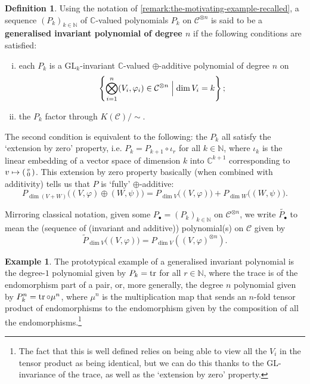 \documentclass[11pt,fleqn]{article}
\theoremstyle{plain}
\theoremstyle{definition}
\newtheorem{definition}[theorem]{Definition}
\newtheorem{example}[theorem]{Example}
\theoremstyle{remark}
\numberwithin{equation}{theorem}
\newcommand{\GL}{\mathrm{GL}}
\newcommand{\define}[1]{\textbf{#1}}
\begin{document}
        \begin{definition}\label{definition:generalised-invariant-polynomial}
            Using the notation of \cref{remark:the-motivating-example-recalled}, a sequence $(P_k)_{k\in\mathbb{N}}$ of $\mathbb{C}$-valued polynomials $P_k$ on $\mathcal{C}^{\otimes n}$ is said to be a \define{generalised invariant polynomial of degree $n$} if the following conditions are satisfied:
            \begin{enumerate}[(i)]
                \item each $P_k$ is a $\GL_k$-invariant $\mathbb{C}$-valued $\oplus$-additive polynomial of degree $n$ on
                \[
                    \left\{\bigotimes_{i=1}^n(V_i,\varphi_i)\in\mathcal{C}^{\otimes n} \Bigm\vert \dim V_i=k\right\};
                \]
                \item the $P_k$ factor through $K(\mathcal{C})/\!\sim$.
            \end{enumerate}
            The second condition is equivalent to the following: the $P_k$ all satisfy the `extension by zero' property, i.e. $P_k=P_{k+1}\circ\iota_r$ for all $k\in\mathbb{N}$, where $\iota_k$ is the linear embedding of a vector space of dimension $k$ into $\mathbb{C}^{k+1}$ corresponding to $v\mapsto\smqty(v\\0)$.
            This extension by zero property basically (when combined with additivity) tells us that $P$ is `fully' $\oplus$-additive:
            \[
                P_{\dim(V+W)}\big((V,\varphi)\oplus(W,\psi)\big) = P_{\dim V}\big((V,\varphi)\big) + P_{\dim W}\big((W,\psi)\big).
            \]

            Mirroring classical notation, given some \mbox{$P_\bullet=(P_k)_{k\in\mathbb{N}}$} on $\mathcal{C}^{\otimes n}$, we write $\widetilde{P_\bullet}$ to mean the (sequence of (invariant and additive)) polynomial(s) on $\mathcal{C}$ given by
            \[
                \widetilde{P}_{\dim V}\big((V,\varphi)\big) = P_{\dim V}\left((V,\varphi)^{\otimes n}\right).
            \]
        \end{definition}

        \begin{example}
            The prototypical example of a generalised invariant polynomial is the degree-$1$ polynomial given by $P_k=\tr$ for all $r\in\mathbb{N}$, where the trace is of the endomorphism part of a pair, or, more generally, the degree $n$ polynomial given by $P_k^n=\tr\circ\mu^n$, where $\mu^n$ is the multiplication map that sends an $n$-fold tensor product of endomorphisms to the endomorphism given by the composition of all the endomorphisms.\footnote{The fact that this is well defined relies on being able to view all the $V_i$ in the tensor product as being identical, but we can do this thanks to the $\GL$-invariance of the trace, as well as the `extension by zero' property.}
        \end{example}
\end{document}
